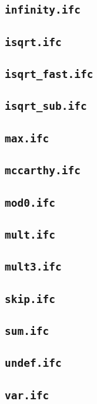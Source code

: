 \subsection{\texttt{infinity.ifc}}


\subsection{\texttt{isqrt.ifc}}


\subsection{\texttt{isqrt\_fast.ifc}}


\subsection{\texttt{isqrt\_sub.ifc}}


\subsection{\texttt{max.ifc}}


\subsection{\texttt{mccarthy.ifc}}


\subsection{\texttt{mod0.ifc}}


\subsection{\texttt{mult.ifc}}


\subsection{\texttt{mult3.ifc}}


\subsection{\texttt{skip.ifc}}


\subsection{\texttt{sum.ifc}}


\subsection{\texttt{undef.ifc}}


\subsection{\texttt{var.ifc}}

